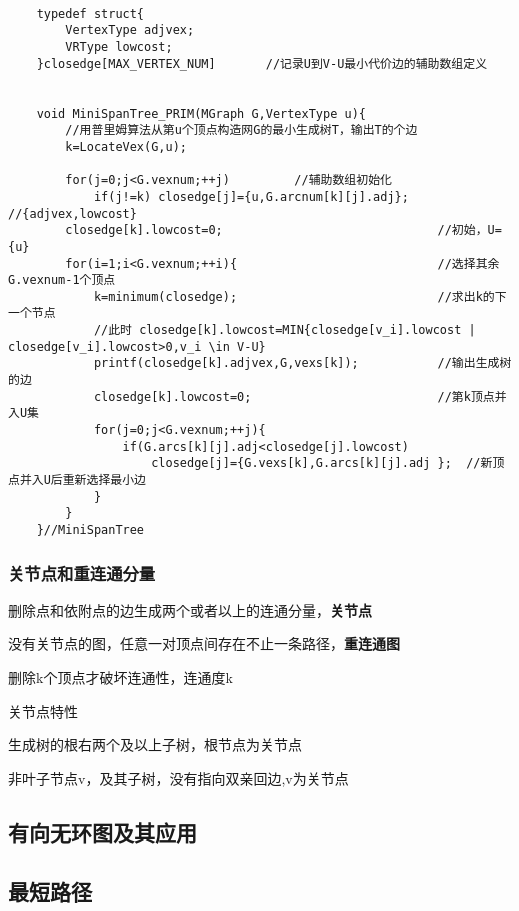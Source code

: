 \documentclass[UTF8]{ctexart}
\newcommand{\mb}[1]{\textbf{#1}}
\newcommand{\q}{\quad}
\begin{document}
\begin{lstlisting}[style=v1]

    typedef struct{
        VertexType adjvex;
        VRType lowcost;
    }closedge[MAX_VERTEX_NUM]       //记录U到V-U最小代价边的辅助数组定义


    void MiniSpanTree_PRIM(MGraph G,VertexType u){
        //用普里姆算法从第u个顶点构造网G的最小生成树T，输出T的个边
        k=LocateVex(G,u);

        for(j=0;j<G.vexnum;++j)         //辅助数组初始化   
            if(j!=k) closedge[j]={u,G.arcnum[k][j].adj};    //{adjvex,lowcost}
        closedge[k].lowcost=0;                              //初始，U={u}    
        for(i=1;i<G.vexnum;++i){                            //选择其余G.vexnum-1个顶点
            k=minimum(closedge);                            //求出k的下一个节点
            //此时 closedge[k].lowcost=MIN{closedge[v_i].lowcost | closedge[v_i].lowcost>0,v_i \in V-U}
            printf(closedge[k].adjvex,G,vexs[k]);           //输出生成树的边
            closedge[k].lowcost=0;                          //第k顶点并入U集
            for(j=0;j<G.vexnum;++j){
                if(G.arcs[k][j].adj<closedge[j].lowcost)
                    closedge[j]={G.vexs[k],G.arcs[k][j].adj };  //新顶点并入U后重新选择最小边
            }
        }
    }//MiniSpanTree

\end{lstlisting}
 
\subsubsection{关节点和重连通分量}

删除点和依附点的边生成两个或者以上的连通分量，\mb{关节点}

没有关节点的图，任意一对顶点间存在不止一条路径，\mb{重连通图}

删除k个顶点才破坏连通性，连通度k

关节点特性

    \q 生成树的根右两个及以上子树，根节点为关节点
    
    \q 非叶子节点v，及其子树，没有指向双亲回边,v为关节点



\subsection{有向无环图及其应用}


\subsection{最短路径}
\end{document}
